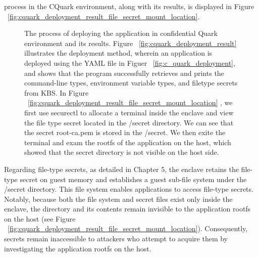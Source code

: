 process in the CQuark environment, along with its results, is displayed in Figure ~\ref{fig:cquark_deployment_result_file_secret_mount_location}.
\begin{figure}[H]

    
    
    \caption[The process of deploying the application in confidential Quark environment and its results.]{The process of deploying the application in confidential Quark environment and its results. Figure ~\ref{fig:cquark_deployment_result} illustrates the deployment method, wherein an application is deployed using the YAML file in Figuer ~\ref{fig:c_quark_deployment},  
    and shows that the program successfully retrieves and prints the command-line types, environment variable types, and file\-type secrets from KBS. In Figure ~\ref{fig:cquark_deployment_result_file_secret_mount_location} , we first use securectl to allocate a terminal inside the enclave and view the file type secret located in the /secret directory. 
    We can see that the secret root-ca.pem is stored in the /secret. We then exite the terminal and exam the rootfs of the application on the host, which showed that the secret directory is not visible on the host side.}
\end{figure}


Regarding file-type secrets, as detailed in Chapter 5, the enclave retains the file-type secret on guest memory and establishes a guest sub-file system under the /secret directory. This file system enables applications to access file-type secrets. Notably, because both the file system and secret 
files exist only inside the enclave, the directory and its contents remain invisible to the application rootfs on the host (see Figure ~\ref{fig:cquark_deployment_result_file_secret_mount_location}). Consequently, secrets remain inaccessible to attackers who attempt to acquire them by 
investigating the application rootfs on the host.


